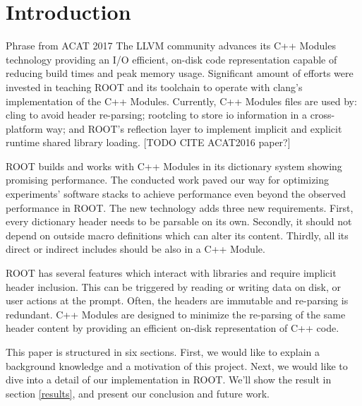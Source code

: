 \documentclass{webofc}
\begin{document}
\section{Introduction}
\label{intro}
Phrase from ACAT 2017
The LLVM community advances its C++ Modules technology providing an I/O efficient, on-disk code representation capable of reducing build times and peak memory usage. Significant amount of efforts were invested in teaching ROOT and its toolchain to operate with clang's implementation of the C++ Modules. Currently, C++ Modules files are used by: cling to avoid header re-parsing; rootcling to store io information in a cross-platform way; and ROOT's reflection layer to implement implicit and explicit runtime shared library loading. [TODO CITE ACAT2016 paper?]

ROOT builds and works with C++ Modules in its dictionary system showing promising performance. The conducted work paved our way for optimizing experiments' software stacks to achieve performance even beyond the observed performance in ROOT. The new technology adds three new requirements. First, every dictionary header needs to be parsable on its own. Secondly, it should not depend on outside macro definitions which can alter its content. Thirdly, all its direct or indirect includes should be also in a C++ Module.

ROOT has several features which interact with libraries and require implicit header inclusion. This can be triggered by reading or writing data on disk, or user actions at the prompt. Often, the headers are immutable and re-parsing is redundant. C++ Modules are designed to minimize the re-parsing of the same header content by providing an efficient on-disk representation of C++ code.

This paper is structured in six sections. First, we would like to explain a background knowledge and a motivation of this project. Next, we would like to dive into a detail of our implementation in ROOT. We'll show the result in section \ref{results}, and present our conclusion and future work.

\end{document}
